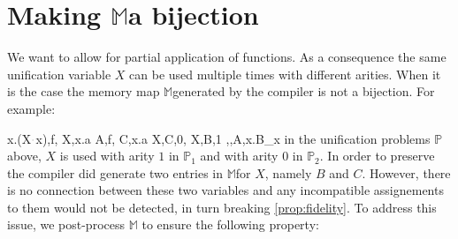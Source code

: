\documentclass[sigconf,natbib=false,review]{acmart}
\newcommand{\appsep}{\ensuremath{\textcolor{lightgray}{\cdot}}}
\newcommand{\UnifRel}{\ensuremath{\simeq}}
\newcommand{\Ue}{\ensuremath{\UnifRel_m}\xspace}
\newcommand{\linkMacro}[1]{\ensuremath{#1}\texttt{-link}\xspace}
\newcommand{\linketa} {\linkMacro{\eta}}
\newcommand{\lhs}{lhs\xspace}
\newcommand{\rhs}{rhs\xspace}
\newcommand{\mapStore}{\texorpdfstring{\ensuremath{\mathbb{M}}\xspace}{M}}
\newcommand{\foUnifPb}{\ensuremath{\mathbb{P}}\xspace}
\begin{document}

\begin{comment}
\paragraph{Example of \progressetadedup}

A very basic example of \linketa deduplication, is given below:
\printAlll
  {{{\lambda x.(X\appsep x),\lambda x.(Y\appsep x)}}}
  {{{A,C}}}
  {{{X,B,1},
    {Y,D,1}}}
  {{{\eta,,A,\lambda x.B_{x}},
    {\eta,,C,\lambda x.D_{x}}}}

\noindent
The result of $A \Ue{} C$ is that the two \linketa share the same \lhs.
By unifying the two \rhs we get
$\sigma = \{ A~ \mapsto C, B \mapsto D ~\}$.
In turn, given the map \mapStore, this second assignment is decompiled to
$\rho = \{~ X \mapsto Y ~\}$ as expected.
\end{comment}



\section{Making \mapStore a bijection}
\label{sec:invariant1}

We want to allow for partial application of functions.
As a consequence
the same unification variable $X$ can be used multiple times
with different arities.
When it is the case the
memory map \mapStore generated by the compiler is not
a bijection. For example:
\begin{comment}
%
\printAlll
  {{{\lambda x.\lambda y.(X\appsep y\appsep x),\lambda x.\lambda y.x},
    {\lambda x.(f\appsep (X\appsep x)\appsep x),Y}}}
  {{{A,\lambda x.\lambda y.x},
    {D,F}}}
  {{{X,E,1},
    {Y,F,0},
    {X,C,2}}}
  {{{\eta,,D,\lambda x.(f\appsep E_{x}\appsep x)},
    {\eta,,A,\lambda x.B_{x}},
    {\eta,x,B_{x},\lambda y.C_{y x}}}}
\end{comment}
\printAlll
  {{{\lambda x.(X\appsep x),f},
    {X,\lambda x.a}}}
  {{{A,f},
    {C,\lambda x.a}}}
  {{{X,C,0},
    {X,B,1}}}
  {{{\eta,,A,\lambda x.B_{x}}}}
in the unification problems \foUnifPb above, $X$ is used with arity $1$ in
$\foUnifPb_1$ and with arity $0$ in $\foUnifPb_2$. 
In order to preserve  the compiler
did generate two entries in \mapStore for $X$, namely $B$ and $C$. 
However, there is no connection between these two variables
and any incompatible assignements to them would not be detected,
in turn breaking \cref{prop:fidelity}. 
To address this issue, we post-process \mapStore
to ensure the following property:
\end{document}
